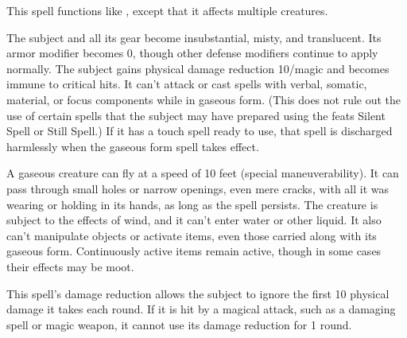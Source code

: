\spellrng{\rngmed}
\begin{spelleffect}
  This spell functions like , except that it affects multiple creatures.
\end{spelleffect}

\begin{comment}
\subsubsection{G}
\end{comment}

\spellrng{\rngtouch}
\begin{spelleffect}
  The subject and all its gear become insubstantial, misty, and translucent. Its armor modifier becomes 0, though other defense modifiers continue to apply normally. The subject gains physical damage reduction 10/magic and becomes immune to critical hits. It can't attack or cast spells with verbal, somatic, material, or focus components while in gaseous form. (This does not rule out the use of certain spells that the subject may have prepared using the feats Silent Spell or Still Spell.) If it has a touch spell ready to use, that spell is discharged harmlessly when the gaseous form spell takes effect.
  \par A gaseous creature can fly at a speed of 10 feet (special maneuverability). It can pass through small holes or narrow openings, even mere cracks, with all it was wearing or holding in its hands, as long as the spell persists. The creature is subject to the effects of wind, and it can't enter water or other liquid. It also can't manipulate objects or activate items, even those carried along with its gaseous form. Continuously active items remain active, though in some cases their effects may be moot.
\end{spelleffect}
\begin{spellnotes}
  This spell's damage reduction allows the subject to ignore the first 10 physical damage it takes each round. If it is hit by a magical attack, such as a damaging spell or magic weapon, it cannot use its damage reduction for 1 round.
\end{spellnotes}

